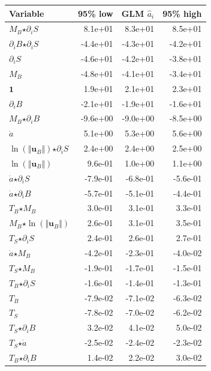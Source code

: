 \begin{table}[H]
\centering
\begin{tabular}{l|r|r|r}
  \textbf{Variable} & \textbf{95\% low} & \textbf{GLM} $\hat{a}_i$ & \textbf{95\% high} \\
  \hline
  $M_B$$ \star $$\partial_i S$ & 8.1e+01 & 8.3e+01 & 8.5e+01 \\
  $\partial_i B$$ \star $$\partial_i S$ & -4.4e+01 & -4.3e+01 & -4.2e+01 \\
  $\partial_i S$ & -4.6e+01 & -4.2e+01 & -3.8e+01 \\
  $M_B$ & -4.8e+01 & -4.1e+01 & -3.4e+01 \\
  $\mathbf{1}$ & 1.9e+01 & 2.1e+01 & 2.3e+01 \\
  $\partial_i B$ & -2.1e+01 & -1.9e+01 & -1.6e+01 \\
  $M_B$$ \star $$\partial_i B$ & -9.6e+00 & -9.0e+00 & -8.5e+00 \\
  $\dot{a}$ & 5.1e+00 & 5.3e+00 & 5.6e+00 \\
  $\ln\left( \Vert \mathbf{u}_B \Vert \right)$$ \star $$\partial_i S$ & 2.4e+00 & 2.4e+00 & 2.5e+00 \\
  $\ln\left( \Vert \mathbf{u}_B \Vert \right)$ & 9.6e-01 & 1.0e+00 & 1.1e+00 \\
  $\dot{a}$$ \star $$\partial_i S$ & -7.9e-01 & -6.8e-01 & -5.6e-01 \\
  $\dot{a}$$ \star $$\partial_i B$ & -5.7e-01 & -5.1e-01 & -4.4e-01 \\
  $T_B$$ \star $$M_B$ & 3.0e-01 & 3.1e-01 & 3.3e-01 \\
  $M_B$$ \star $$\ln\left( \Vert \mathbf{u}_B \Vert \right)$ & 2.6e-01 & 3.1e-01 & 3.5e-01 \\
  $T_S$$ \star $$\partial_i S$ & 2.4e-01 & 2.6e-01 & 2.7e-01 \\
  $\dot{a}$$ \star $$M_B$ & -4.2e-01 & -2.3e-01 & -4.0e-02 \\
  $T_S$$ \star $$M_B$ & -1.9e-01 & -1.7e-01 & -1.5e-01 \\
  $T_B$$ \star $$\partial_i S$ & -1.6e-01 & -1.4e-01 & -1.3e-01 \\
  $T_B$ & -7.9e-02 & -7.1e-02 & -6.3e-02 \\
  $T_S$ & -7.8e-02 & -7.0e-02 & -6.2e-02 \\
  $T_S$$ \star $$\partial_i B$ & 3.2e-02 & 4.1e-02 & 5.0e-02 \\
  $T_S$$ \star $$\dot{a}$ & -2.5e-02 & -2.4e-02 & -2.3e-02 \\
  $T_B$$ \star $$\partial_i B$ & 1.4e-02 & 2.2e-02 & 3.0e-02 \\

\end{tabular}
\end{table}

